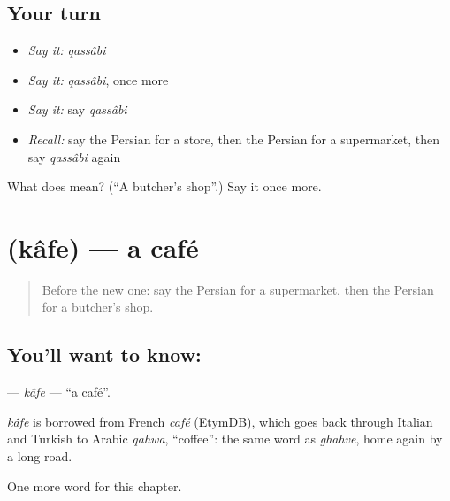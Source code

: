\subsection*{Your turn}
\begin{itemize}
\raggedright
  \item \emph{Say it:} \emph{qassâbi}
  \item \emph{Say it:} \emph{qassâbi}, once more
  \item \emph{Say it:} say \emph{qassâbi}
  \item \emph{Recall:} say the Persian for a store, then the Persian for a supermarket, then say \emph{qassâbi} again
\end{itemize}

\begin{tcolorbox}[breakable,colback=teal!4,colframe=teal!35!black,title={Before you move on}]
What does  mean? (\textquotedblleft{}A butcher's shop\textquotedblright{}.) Say it once more.
\end{tcolorbox}
\section[\texorpdfstring{\fa{کافه} (kâfe)}{کافه (kâfe)}]{ (kâfe) — a café}

\label{lesson:FA-C154-kafe}



\begin{quote}
Before the new one: say the Persian for a supermarket, then the Persian for a butcher's shop.
\end{quote}

\subsection*{You'll want to know: }
\textbf{} — \emph{kâfe} — \textquotedblleft{}a café\textquotedblright{}.

\begin{cousinweb}
\emph{kâfe} is borrowed from French \emph{café} (EtymDB), which goes back through Italian and Turkish to Arabic \emph{qahwa}, \textquotedblleft{}coffee\textquotedblright{}: the same word as \emph{ghahve}, home again by a long road.
\end{cousinweb}

\begin{grammarlens}[title={What you've built}]
One more word for this chapter.
\end{grammarlens}


